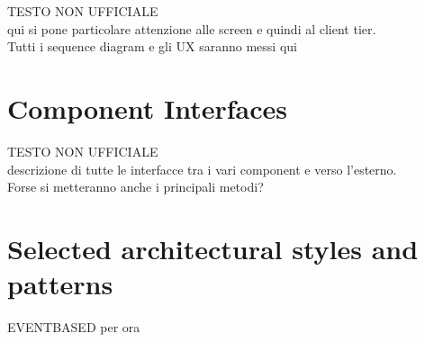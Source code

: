 \documentclass[\mainpath/main]{subfiles}
\begin{document}
TESTO NON UFFICIALE\\
qui si pone particolare attenzione alle screen e quindi al client tier.\\
Tutti i sequence diagram e gli UX saranno messi qui\\

\section{Component Interfaces}
\label{ArchitecturalDesign:comp_interfaces}

TESTO NON UFFICIALE\\
descrizione di tutte le interfacce tra i vari component e verso l'esterno.\\
Forse si metteranno anche i principali metodi?\\


\section{Selected architectural styles and patterns}
\label{ArchitecturalDesign:design_patterns}


EVENTBASED per ora\\


\end{document}
